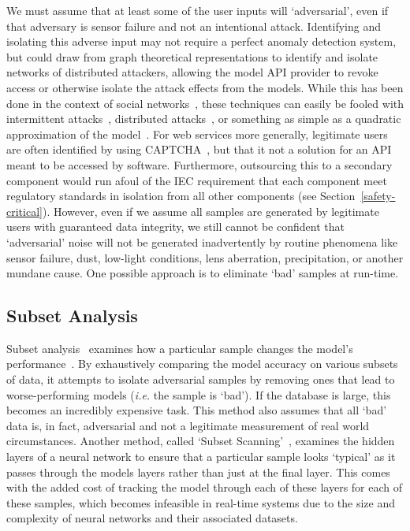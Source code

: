 \documentclass[journal]{IEEEtran}
\begin{document}
We must assume that at least some of the user inputs will `adversarial', even if that adversary is sensor failure and not an intentional attack.
Identifying and isolating this adverse input may not require a perfect anomaly detection system, but could draw from graph theoretical representations to identify and isolate networks of distributed attackers, allowing the model API provider to revoke access or otherwise isolate the attack effects from the models.
While this has been done in the context of social networks~\cite{daya_graph-based_2019}, these techniques can easily be fooled with intermittent attacks~\cite{intermittent}, distributed attacks~\cite{distributed_attacks}, or something as simple as a quadratic approximation of the model~\cite{hopskipjump}.
For web services more generally, legitimate users are often identified by using CAPTCHA~\cite{ahn2003captcha}, but that it not a solution for an API meant to be accessed by software.
Furthermore, outsourcing this to a secondary component would run afoul of the IEC requirement that each component meet regulatory standards in isolation from all other components (see Section~\ref{safety-critical}).
However, even if we assume all samples are generated by legitimate users with guaranteed data integrity, we still cannot be confident that `adversarial' noise will not be generated inadvertently by routine phenomena like sensor failure, dust, low-light conditions, lens aberration, precipitation, or another mundane cause.
One possible approach is to eliminate `bad' samples at run-time.

\subsection{Subset Analysis}

Subset analysis~\cite{paudice_detection_2018} examines how a particular sample changes the model's performance~\cite{paudice_detection_2018}.
By exhaustively comparing the model accuracy on various subsets of data, it attempts to isolate adversarial samples by removing ones that lead to worse-performing models (\textit{i.e.} the sample is `bad').
If the database is large, this becomes an incredibly expensive task.
This method also assumes that all `bad' data is, in fact, adversarial and not a legitimate measurement of real world circumstances.
Another method, called `Subset Scanning'~\cite{cintas_detecting_2020}, examines the hidden layers of a neural network to ensure that a particular sample looks `typical' as it passes through the models layers rather than just at the final layer.
This comes with the added cost of tracking the model through each of these layers for each of these samples, which becomes infeasible in real-time systems due to the size and complexity of neural networks and their associated datasets.
\end{document}
